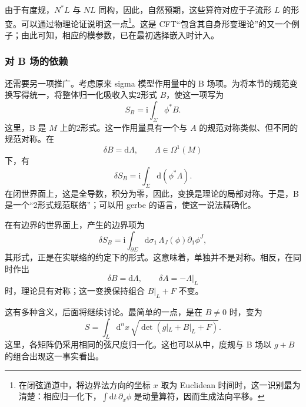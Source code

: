 由于有度规，$N^*L$ 与 $NL$ 同构，因此，自然预期，这些算符对应于子流形 $L$ 的形变。可以通过物理论证说明这一点\footnote{在闭弦通道中，将边界法方向的坐标 $x$ 取为 Euclidean 时间时，这一识别最为清楚：相应归一化下，$\int\mathrm{d}t\,\partial_x\phi$ 是动量算符，因而生成法向平移。}。这是 CFT“包含其自身形变理论”的又一个例子；由此可知，相应的模参数，已在最初选择嵌入时计入。

\subsubsection{对 B 场的依赖}\label{sec:3.5.2.7}

还需要另一项推广。考虑原来 sigma 模型作用量中的 B 场项。为将本节的规范变换写得统一，将整体归一化吸收入实2形式 $B$，使这一项写为
\begin{equation}\label{eq:3.146}
S_B=\mathrm{i}\int_\Sigma\phi^*B.
\end{equation}
这里，B 是 $M$ 上的2形式。这一作用量具有一个与 $A$ 的规范对称类似、但不同的规范对称。在
\begin{equation}\label{eq:3.147}
\delta B=\mathrm{d}\Lambda,\qquad\Lambda\in\Omega^1(M)
\end{equation}
下，有
\begin{equation}\label{eq:3.148}
\delta S_B=\mathrm{i}\int_\Sigma\mathrm{d}(\phi^*\Lambda).
\end{equation}
在闭世界面上，这是全导数，积分为零，因此，变换是理论的局部对称。于是，B 是一个“2形式规范联络”；可以用 gerbe 的语言，使这一说法精确化。

在有边界的世界面上，产生的边界项为
\begin{equation}\label{eq:3.149}
\delta S_B=\mathrm{i}\int_{\partial\Sigma}\mathrm{d}\sigma_1\,
\Lambda_J(\phi)\partial_1\phi^J,
\end{equation}
其形式，正是在实联络的约定下的形式。这意味着，单独并不是对称。相反，在同时作出
\begin{equation}\label{eq:3.150}
\delta B=\mathrm{d}\Lambda,\qquad
\delta A=-\Lambda|_L
\end{equation}
时，理论具有对称；这一变换保持组合 $B|_L+F$ 不变。

这有多种含义，后面将继续讨论。最简单的一点，是在 $B\ne0$ 时，变为
\begin{equation}\label{eq:3.151}
S=\int_L\mathrm{d}^nx\,
\sqrt{\det(g|_L+B|_L+F)}.
\end{equation}
这里，各矩阵仍采用相同的弦尺度归一化。这也可以从中，度规与 B 场以 $g+B$ 的组合出现这一事实看出。

